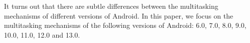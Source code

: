 It turns out that there are subtle differences between the multitasking mechanisms of different versions of Android. In this paper, we focus on the multitasking mechanisms of the following versions of Android: 6.0, 7.0, 8.0, 9.0, 10.0, 11.0, 12.0 and 13.0. 

%

